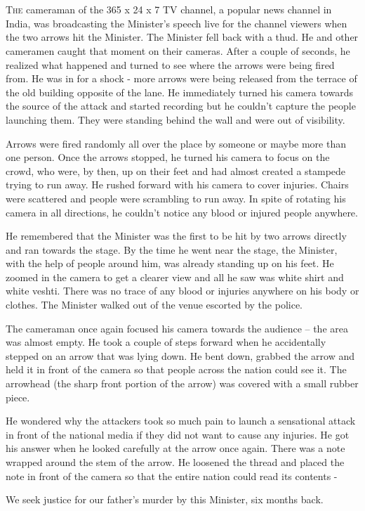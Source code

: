 \chapter{}

\lettrine{T}{he} cameraman of the 365 x 24 x 7 TV channel, a popular news channel in India,
was broadcasting the Minister's speech live for the channel viewers when the two
arrows hit the Minister. The Minister fell back with a thud. He and other
cameramen caught that moment on their cameras. After a couple of seconds, he
realized what happened and turned to see where the arrows were being fired from.
He was in for a shock - more arrows were being released from the terrace of the
old building opposite of the lane. He immediately turned his camera towards the
source of the attack and started recording but he couldn't capture the people
launching them. They were standing behind the wall and were out of visibility.

Arrows were fired randomly all over the place by someone or maybe more than one
person. Once the arrows stopped, he turned his camera to focus on the crowd, who
were, by then, up on their feet and had almost created a stampede trying to run
away. He rushed forward with his camera to cover injuries. Chairs were scattered
and people were scrambling to run away. In spite of rotating his camera in all
directions, he couldn't notice any blood or injured people anywhere.

He remembered that the Minister was the first to be hit by two arrows directly
and ran towards the stage. By the time he went near the stage, the Minister,
with the help of people around him, was already standing up on his feet. He
zoomed in the camera to get a clearer view and all he saw was white shirt and
white veshti. There was no trace of any blood or injuries anywhere on his body
or clothes. The Minister walked out of the venue escorted by the police.

The cameraman once again focused his camera towards the audience – the area was
almost empty. He took a couple of steps forward when he accidentally stepped on
an arrow that was lying down. He bent down, grabbed the arrow and held it in
front of the camera so that people across the nation could see it. The arrowhead
(the sharp front portion of the arrow) was covered with a small rubber piece.

He wondered why the attackers took so much pain to launch a sensational attack
in front of the national media if they did not want to cause any injuries. He
got his answer when he looked carefully at the arrow once again. There was a
note wrapped around the stem of the arrow. He loosened the thread and placed the
note in front of the camera so that the entire nation could read its contents -

We seek justice for our father's murder by this Minister, six months back.
